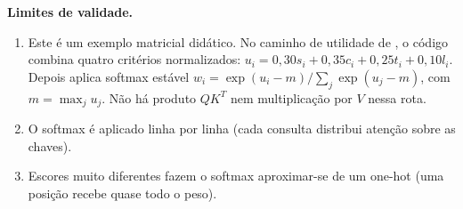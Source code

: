 \begin{aviso}
\textbf{Limites de validade.}
\begin{enumerate}[leftmargin=1.3em,itemsep=1pt]
  \item Este é um exemplo matricial didático. No caminho de utilidade de , o código combina quatro critérios normalizados: $u_i=0{,}30s_i+0{,}35c_i+0{,}25t_i+0{,}10l_i$. Depois aplica softmax estável $w_i=\exp(u_i-m)/\sum_j\exp(u_j-m)$, com $m=\max_j u_j$. Não há produto $QK^T$ nem multiplicação por $V$ nessa rota.
  \item O softmax é aplicado linha por linha (cada consulta distribui atenção sobre as chaves).
  \item Escores muito diferentes fazem o softmax aproximar-se de um one-hot (uma posição recebe quase todo o peso).
\end{enumerate}
\end{aviso}


